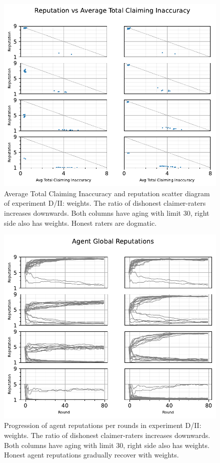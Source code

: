 \documentclass[%
    ]{\PathToTumTemplate/thesis/tum_thesis}
\begin{document}
\begin{figure}[tbp]
  \begin{center}
        \includegraphics[width=0.75\linewidth]	{../results/d2/AvgTotClaimInaccuracyAndReputationScatter_joined.pdf}
    \caption{
    Average Total Claiming Inaccuracy and reputation scatter diagram of experiment D/II: weights.
    The ratio of dishonest claimer-raters increases downwards.
    Both columns have aging with limit 30, right side also has weights.
    Honest raters are dogmatic.
    }
    \label{fig:res_d2_scatter}
  \end{center}
\end{figure}

\begin{figure}[tbp]
  \begin{center}
        \includegraphics[width=0.75\linewidth]	{../results/d2/ReputationsPerRounds_joined.pdf}
    \caption{
 	Progression of agent reputations per rounds in experiment D/II: weights.
    The ratio of dishonest claimer-raters increases downwards.
    Both columns have aging with limit 30, right side also has weights.
    Honest agent reputations gradually recover with weights.
    }
    \label{fig:res_d2_reps}
  \end{center}
\end{figure}
\end{document}
